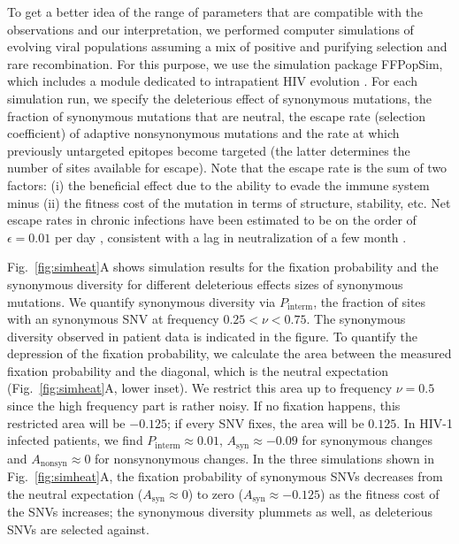 \documentclass[11pt]{article}
\newcommand{\FIG}[1]{Fig.~\ref{fig:#1}}
\begin{document}
To get a better idea of the range of parameters that are compatible with the
observations and our interpretation, we performed computer simulations of
evolving viral populations assuming a mix of positive and purifying selection
and rare recombination.  For this purpose, we use the simulation package
FFPopSim, which includes a module dedicated to intrapatient HIV evolution
\citep{zanini_ffpopsim:_2012}. For each simulation run, we specify the
deleterious effect of synonymous mutations, the fraction of synonymous mutations
that are neutral, the escape rate (selection coefficient) of adaptive
nonsynonymous mutations and the rate at which previously untargeted epitopes
become targeted (the latter determines the number of sites available for
escape). Note that the escape rate is the sum of two factors: (i) the beneficial
effect due to the ability to evade the immune system minus (ii) the fitness cost
of the mutation in terms of structure, stability, etc. Net escape rates in
chronic infections have been estimated to be on the order of $\epsilon = 0.01$
per day \citep{neher_recombination_2010, Asquith:2006p28003}, consistent
with a lag in neutralization of a few month \citep{richman_rapid_2003}.

\FIG{simheat}A shows simulation results for the fixation probability and the
synonymous diversity for different deleterious effects sizes of synonymous mutations.
We quantify synonymous diversity via $P_\text{interm}$, the fraction of sites
with an synonymous SNV at frequency $0.25 < \nu < 0.75$. The synonymous diversity
observed in patient data is indicated in the figure. To quantify the depression
of the fixation probability, we calculate the area between the measured fixation
probability and the diagonal, which is the neutral expectation
(\FIG{simheat}A, lower inset). We restrict this area up to frequency
$\nu=0.5$ since the high frequency part is rather noisy.
If no fixation happens, this restricted area will be
$-0.125$; if every SNV fixes, the area will be $0.125$. In HIV-1 infected
patients, we find $P_\text{interm} \approx 0.01$, $A_\text{syn} \approx -0.09$
for synonymous changes and $A_\text{nonsyn} \approx 0$ for nonsynonymous
changes. In the three simulations shown in \FIG{simheat}A, the fixation
probability of synonymous SNVs decreases from the neutral expectation
($A_\text{syn} \approx 0$) to zero ($A_\text{syn} \approx -0.125$) as the
fitness cost of the SNVs increases; the synonymous diversity plummets as well, as
deleterious SNVs are selected against.
\end{document}
